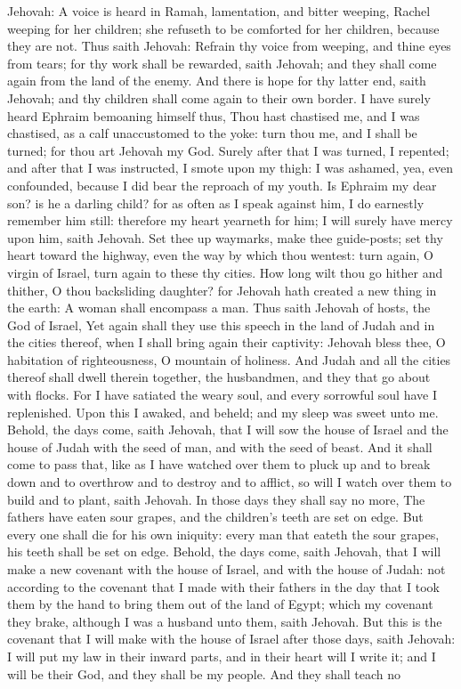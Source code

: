 Jehovah: A voice is heard in Ramah, lamentation, and bitter weeping, Rachel weeping for her children; she refuseth to be comforted for her children, because they are not. Thus saith Jehovah: Refrain thy voice from weeping, and thine eyes from tears; for thy work shall be rewarded, saith Jehovah; and they shall come again from the land of the enemy. And there is hope for thy latter end, saith Jehovah; and thy children shall come again to their own border. I have surely heard Ephraim bemoaning himself thus, Thou hast chastised me, and I was chastised, as a calf unaccustomed to the yoke: turn thou me, and I shall be turned; for thou art Jehovah my God. Surely after that I was turned, I repented; and after that I was instructed, I smote upon my thigh: I was ashamed, yea, even confounded, because I did bear the reproach of my youth. Is Ephraim my dear son? is he a darling child? for as often as I speak against him, I do earnestly remember him still: therefore my heart yearneth for him; I will surely have mercy upon him, saith Jehovah.  Set thee up waymarks, make thee guide-posts; set thy heart toward the highway, even the way by which thou wentest: turn again, O virgin of Israel, turn again to these thy cities. How long wilt thou go hither and thither, O thou backsliding daughter? for Jehovah hath created a new thing in the earth: A woman shall encompass a man.  Thus saith Jehovah of hosts, the God of Israel, Yet again shall they use this speech in the land of Judah and in the cities thereof, when I shall bring again their captivity: Jehovah bless thee, O habitation of righteousness, O mountain of holiness. And Judah and all the cities thereof shall dwell therein together, the husbandmen, and they that go about with flocks. For I have satiated the weary soul, and every sorrowful soul have I replenished. Upon this I awaked, and beheld; and my sleep was sweet unto me.  Behold, the days come, saith Jehovah, that I will sow the house of Israel and the house of Judah with the seed of man, and with the seed of beast. And it shall come to pass that, like as I have watched over them to pluck up and to break down and to overthrow and to destroy and to afflict, so will I watch over them to build and to plant, saith Jehovah. In those days they shall say no more, The fathers have eaten sour grapes, and the children’s teeth are set on edge. But every one shall die for his own iniquity: every man that eateth the sour grapes, his teeth shall be set on edge.  Behold, the days come, saith Jehovah, that I will make a new covenant with the house of Israel, and with the house of Judah: not according to the covenant that I made with their fathers in the day that I took them by the hand to bring them out of the land of Egypt; which my covenant they brake, although I was a husband unto them, saith Jehovah. But this is the covenant that I will make with the house of Israel after those days, saith Jehovah: I will put my law in their inward parts, and in their heart will I write it; and I will be their God, and they shall be my people. And they shall teach no 